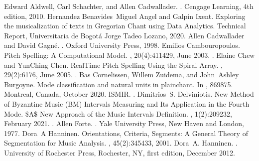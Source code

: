 \documentclass[letterpaper,10pt,english]{sphinxmanual}
\begin{document}
\begin{sphinxthebibliography}{10}
Edward Aldwell, Carl Schachter, and Allen Cadwallader. . Cengage Learning, 4th edition, 2010.
Hernandez Benavides Miguel Angel and Galpin Ixent. Exploring the musicalization of texts in Gregorian Chant using Data Analytics. Technical Report, Universitaria de Bogotá Jorge Tadeo Lozano, 2020.
Allen Cadwallader and David Gagné. . Oxford University Press, 1998.
Emilios Cambouropoulos. Pitch Spelling: A Computational Model. , 20(4):411\textendash{}429, June 2003. .
Elaine Chew and Yun\sphinxhyphen{}Ching Chen. Real\sphinxhyphen{}Time Pitch Spelling Using the Spiral Array. , 29(2):61\textendash{}76, June 2005. .
Bas Cornelissen, Willem Zuidema, and John Ashley Burgoyne. Mode classification and natural units in plainchant. In , 869\textendash{}875. Montreal, Canada, October 2020. ISMIR. .
Dimitrios S. Delviniotis. New Method of Byzantine Music (BM) Intervals\textquotesingle{} Measuring and Its Application in the Fourth Mode. \$A\$ New Approach of the Music Intervals\textquotesingle{} Definition. , 1(2):209\textendash{}232, February 2021. .
Allen Forte. . Yale University Press, New Haven and London, 1977.
Dora A Hanninen. Orientations, Criteria, Segments: A General Theory of Segmentation for Music Analysis. , 45(2):345\textendash{}433, 2001.
Dora A. Hanninen. . University of Rochester Press, Rochester, NY, first edition, December 2012.

\end{sphinxthebibliography}
\end{document}
